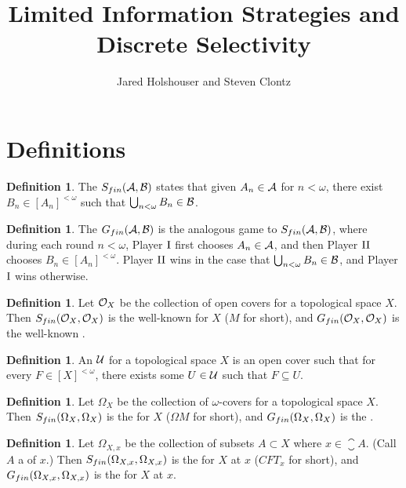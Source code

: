 \documentclass[11pt]{article}
\title{Limited Information Strategies and Discrete Selectivity}
\author{Jared Holshouser and Steven Clontz}
\theoremstyle{plain}
\theoremstyle{definition}
\newtheorem{definition}[theorem]{Definition}
\theoremstyle{remark}
\theoremstyle{plain}
\theoremstyle{definition}
\theoremstyle{remark}
\begin{document}
\maketitle

\section{Definitions}

\begin{definition}
  The  \(S_{fin}(\mathcal{A},\mathcal{B})\) states that
  given \(A_n\in\mathcal{A}\) for \(n<\omega\), there exist \(B_n\in[A_n]^{<\omega}\)
  such that \(\bigcup_{n<\omega}B_n\in\mathcal{B}\).
\end{definition}

\begin{definition}
  The  \(G_{fin}(\mathcal{A},\mathcal{B})\) is the
  analogous game to \(S_{fin}(\mathcal{A},\mathcal{B})\), where during each
  round \(n<\omega\), Player \(\mathrm{I}\) first
  chooses \(A_n\in\mathcal{A}\), and then Player \(\mathrm{II}\) chooses
  \(B_n\in[A_n]^{<\omega}\).
  Player \(\mathrm{II}\) wins in the case that \(\bigcup_{n<\omega}B_n\in\mathcal{B}\),
  and Player \(\mathrm{I}\) wins otherwise.
\end{definition}

\begin{definition}
  Let \(\mathcal{O}_X\) be the collection of open covers for a topological space
  \(X\). Then \(S_{fin}(\mathcal{O}_X,\mathcal{O}_X)\) is the well-known
   for \(X\) (\(M\) for short), and
  \(G_{fin}(\mathcal{O}_X,\mathcal{O}_X)\) is the
  well-known .
\end{definition}

\begin{definition}
  An  \(\mathcal{U}\)
  for a topological space \(X\) is an open cover
  such that for every \(F\in[X]^{<\omega}\), there exists some \(U\in\mathcal{U}\)
  such that \(F\subseteq U\).
\end{definition}

\begin{definition}
  Let \(\Omega_X\) be the collection of \(\omega\)-covers for a topological
  space \(X\). Then \(S_{fin}(\Omega_X,\Omega_X)\) is the
   for \(X\) (\(\Omega M\) for short), and
  \(G_{fin}(\Omega_X,\Omega_X)\) is the .
\end{definition}

\begin{definition}
  Let \(\Omega_{X,x}\) be the collection of subsets \(A\subset X\) where
  \(x\in\closure{A}\). (Call \(A\) a  of \(x\).)
  Then \(S_{fin}(\Omega_{X,x},\Omega_{X,x})\) is the
   for \(X\) at \(x\)
  (\(CFT_x\) for short), and
  \(G_{fin}(\Omega_{X,x},\Omega_{X,x})\) is the
   for \(X\) at \(x\).
\end{definition}
\end{document}
